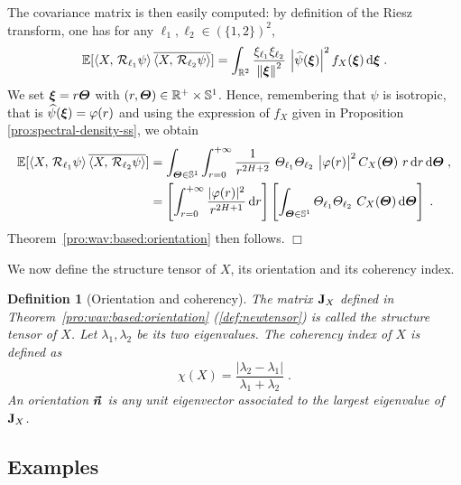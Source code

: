 \documentclass{elsarticle}
\newtheorem{definition}{Definition}
\newenvironment{proof}{\medskip\noindent{\bf Proof.}\;}{\null\hfill $\Box$\par\medskip }
\begin{document}
\begin{proof}
The covariance matrix is then easily computed:
by definition of the Riesz transform, one has for any  $\ell_1,\ell_2 \in(\{1,2\})^2$,
\[
\mathbb{E}[\ip{X}{\mathcal{R}_{\ell_1}\psi}
\overline{\ip{X}{\mathcal{R}_{\ell_2}\psi}}]=\int_{\mathbb{R}^2} \frac{{\xi}_{\ell_1}{\xi}_{\ell_2}}{\norme{\vect{\xi}}^2}~\abs{\widehat{\psi}(\vect{\xi})}^2 f_X(\vect{\xi})\dif \vect{\xi}\;.
\]
We set $\bm{\xi}=r\bm{\Theta}$ with $(r,\bm{\Theta})\in \mathbb{R}^+\times \mathbb{S}^{1}$. Hence, remembering that $\psi$ is isotropic, that is $\widehat \psi (\bm{\xi})= \varphi(r)$ and using	 the expression of $f_X$ given in Proposition \ref{pro:spectral-density-ss}, we obtain
\begin{align*}
\mathbb{E}[\ip{X}{\mathcal{R}_{\ell_1}\psi}
\overline{\ip{X}{\mathcal{R}_{\ell_2}\psi}}]
&=\int_{\vect{\Theta}\in\mathbb{S}^{1}}\int_{r=0}^{+\infty}\frac{1}{r^{2H+2}}~{\Theta}_{\ell_1}{\Theta}_{\ell_2}~\abs{ \varphi(r)}^2C_X(\vect{\Theta}) ~r\dif r  \dif\vect{\Theta}\;,\\
&=\left[\int_{r=0}^{+\infty}\frac{\lvert  \varphi(r)\rvert ^2}{r^{2H+1}}\dif r\right]
\left[\int_{\vect{\Theta}\in\mathbb{S}^{1}} {\Theta}_{\ell_1}{\Theta}_{\ell_2}~C_X(\vect{\Theta})\dif \vect{\Theta}\right]\;.
\end{align*}
Theorem~\ref{pro:wav:based:orientation} then follows.
\end{proof}

\noindent We now define the structure tensor of $X$, its orientation and its coherency index.
\begin{definition}[Orientation and coherency]\label{def:orientation}
The matrix $\mathbf{J}_X$ defined in Theorem~\ref{pro:wav:based:orientation} (\ref{def:newtensor}) is called the structure tensor of $X$. Let $\lambda_1,\lambda_2$ be its two eigenvalues. The coherency index of $X$ is defined as
\[
\chi(X)=\frac{|\lambda_2-\lambda_1|}{\lambda_1+\lambda_2}\;.
\]
An orientation $\bm{\vec n}$ is any unit eigenvector associated to the largest eigenvalue of $\mathbf{J}_X$.
\end{definition}

\subsection{Examples\\}\label{s:examples}
\end{document}
